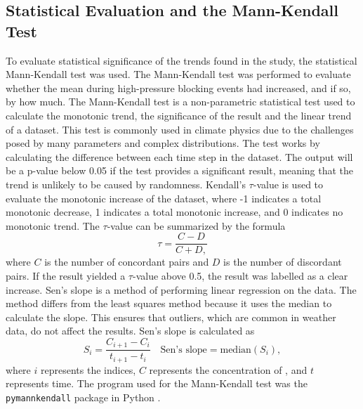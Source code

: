 \subsection{Statistical Evaluation and the Mann-Kendall Test}
To evaluate statistical significance of the trends found in the study, the statistical Mann-Kendall test was used. The Mann-Kendall test was performed to evaluate whether the \PM mean during high-pressure blocking events had increased, and if so, by how much. The Mann-Kendall test is a non-parametric statistical test used to calculate the monotonic trend, the significance of the result and the linear trend of a dataset. This test is commonly used in climate physics due to the challenges posed by many parameters and complex distributions. The test works by calculating the difference between each time step in the dataset. The output will be a p-value below 0.05 if the test provides a significant result, meaning that the trend is unlikely to be caused by randomness. Kendall's $\tau$-value is used to evaluate the monotonic increase of the dataset, where -1 indicates a total monotonic decrease, 1 indicates a total monotonic increase, and 0 indicates no monotonic trend. The $\tau$-value can be summarized by the formula 
\begin{equation}
    \tau = \frac{C - D}{C + D,}
    \label{eq:Kendalltau}
\end{equation}
where $C$ is the number of concordant pairs and $D$ is the number of discordant pairs. If the result yielded a $\tau$-value above 0.5, the result was labelled as a clear increase. Sen's slope is a method of performing linear regression on the data. The method differs from the least squares method because it uses the median to calculate the slope. This ensures that outliers, which are common in weather data, do not affect the results. Sen's slope is calculated as 
\begin{equation}
    S_{i} = \frac{C_{i+1} - C_i}{t_{i+1} - t_i} \quad \text{Sen's slope} = \text{median}(S_{i}),
    \label{eq:Senslope}
\end{equation}
where $i$ represents the indices, $C$ represents the concentration of \PM, and $t$ represents time. The program used for the Mann-Kendall test was the \texttt{pymannkendall} package in Python \cite{hussainmd.PyMannKendallPythonPackage2019}.
